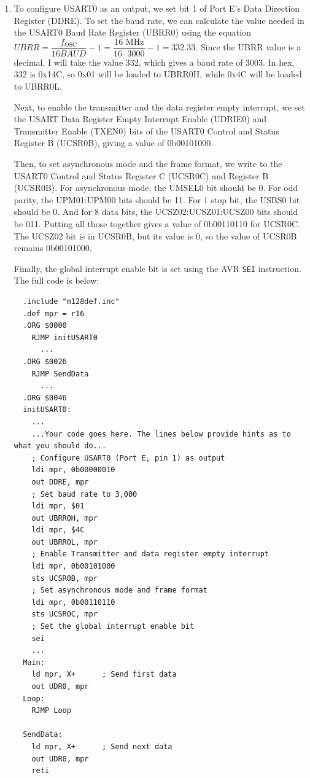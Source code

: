 \documentclass[11pt]{article}
\begin{document}
\begin{enumerate}[leftmargin=0.2in]
\item To configure USART0 as an output, we set bit 1 of Port E's Data Direction Register (DDRE). To set the baud rate, we can calculate the value needed in the USART0 Baud Rate Register (UBRR0) using the equation $UBRR = \dfrac{f_{\text{OSC}}}{16BAUD} - 1 = \dfrac{16\text{ MHz}}{16\cdot 3000} - 1 = 332.33$. Since the UBRR value is a decimal, I will take the value 332, which gives a baud rate of 3003. In hex, 332 is 0x14C, so 0x01 will be loaded to UBRR0H, while 0x4C will be loaded to UBRR0L.

  Next, to enable the transmitter and the data register empty interrupt, we set the USART Data Register Empty Interrupt Enable (UDRIE0) and Transmitter Enable (TXEN0) bits of the USART0 Control and Status Register B (UCSR0B), giving a value of 0b00101000.

  Then, to set asynchronous mode and the frame format, we write to the USART0 Control and Status Register C (UCSR0C) and Register B (UCSR0B). For asynchronous mode, the UMSEL0 bit should be 0. For odd parity, the UPM01:UPM00 bits should be 11. For 1 stop bit, the USBS0 bit should be 0. And for 8 data bits, the UCSZ02:UCSZ01:UCSZ00 bits should be 011. Putting all those together gives a value of 0b00110110 for UCSR0C. The UCSZ02 bit is in UCSR0B, but its value is 0, so the value of UCSR0B remains 0b00101000.

  Finally, the global interrupt enable bit is set using the AVR \texttt{SEI} instruction. The full code is below:

  \begin{verbatim}
  .include "m128def.inc"
  .def mpr = r16
  .ORG $0000
    RJMP initUSART0
      ...
  .ORG $0026
    RJMP SendData
      ...
  .ORG $0046
  initUSART0:
    ...
    ...Your code goes here. The lines below provide hints as to what you should do...
    ; Configure USART0 (Port E, pin 1) as output
    ldi mpr, 0b00000010
    out DDRE, mpr
    ; Set baud rate to 3,000
    ldi mpr, $01
    out UBRR0H, mpr
    ldi mpr, $4C
    out UBRR0L, mpr
    ; Enable Transmitter and data register empty interrupt
    ldi mpr, 0b00101000
    sts UCSR0B, mpr
    ; Set asynchronous mode and frame format
    ldi mpr, 0b00110110
    sts UCSR0C, mpr
    ; Set the global interrupt enable bit
    sei
    ...
  Main:
    ld mpr, X+      ; Send first data
    out UDR0, mpr
  Loop:
    RJMP Loop

  SendData:
    ld mpr, X+      ; Send next data
    out UDR0, mpr
    reti
  \end{verbatim}

\end{enumerate}
\end{document}
